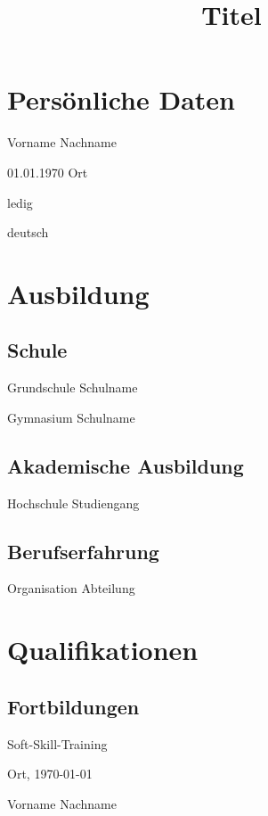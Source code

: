 \documentclass[12pt,a4paper]{moderncv}
\title{Titel}
\newcommand {\myName} {Vorname}
\newcommand {\myLastname} {Nachname}
\newcommand {\city} {Ort}
\begin{document}
\maketitle

\section{Persönliche Daten} %

		{{\myName} {\myLastname}} %
		{} %
		{} %
		{} %
		{} %
		
		{01.01.1970}
		{Ort}
		{}
		{}
		{}
		
		{ledig}
		{}
		{}
		{}
		{}
		
		{deutsch}
		{}
		{}
		{}
		{}

\cvline{}{}{} %

\section{Ausbildung}

\subsection{Schule}
		{Grundschule}
		{Schulname}
		{}
		{}
		{}
		
		{Gymnasium}
		{Schulname}
		{}
		{}
		{}
		{}

\subsection{Akademische Ausbildung}
		{Hochschule}
		{Studiengang}
		{}
		{}
		{}

\subsection{Berufserfahrung}
		{Organisation}
		{Abteilung}
		{}
		{}
		{}

\cvline{}{}{}

\section{Qualifikationen}

\subsection{Fortbildungen}
		{Soft-Skill-Training}
		{}
		{}
		{}
		{}
\null
\vfill

\city, \today 

\cvline{}{}{}

{{\myName} {\myLastname}}
\end{document}
